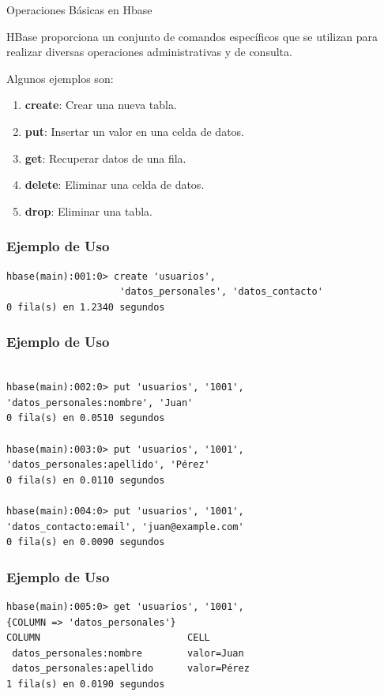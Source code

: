 \begin{frame}{Operaciones Básicas en Hbase}

HBase proporciona un conjunto de comandos específicos que se utilizan para realizar diversas operaciones administrativas y de consulta.
      

    Algunos ejemplos son:

      
    \begin{enumerate}
        \item \textbf{create}: Crear una nueva tabla.  
        \item \textbf{put}: Insertar un valor en una celda de datos.  
        \item \textbf{get}: Recuperar datos de una fila.  
        \item \textbf{delete}: Eliminar una celda de datos.  
        \item \textbf{drop}: Eliminar una tabla.
    \end{enumerate}

\end{frame}

\begin{frame}[fragile]
\frametitle{Ejemplo de Uso}
\begin{verbatim}
hbase(main):001:0> create 'usuarios', 
                    'datos_personales', 'datos_contacto'
0 fila(s) en 1.2340 segundos
\end{verbatim}

\end{frame}

\begin{frame}[fragile]
\frametitle{Ejemplo de Uso}
\begin{verbatim}

hbase(main):002:0> put 'usuarios', '1001', 
'datos_personales:nombre', 'Juan'
0 fila(s) en 0.0510 segundos

hbase(main):003:0> put 'usuarios', '1001', 
'datos_personales:apellido', 'Pérez'
0 fila(s) en 0.0110 segundos

hbase(main):004:0> put 'usuarios', '1001', 
'datos_contacto:email', 'juan@example.com'
0 fila(s) en 0.0090 segundos
\end{verbatim}

\end{frame}

\begin{frame}[fragile]
\frametitle{Ejemplo de Uso}
\begin{verbatim}
hbase(main):005:0> get 'usuarios', '1001', 
{COLUMN => 'datos_personales'}
COLUMN                          CELL
 datos_personales:nombre        valor=Juan
 datos_personales:apellido      valor=Pérez
1 fila(s) en 0.0190 segundos
\end{verbatim}
\end{frame}

